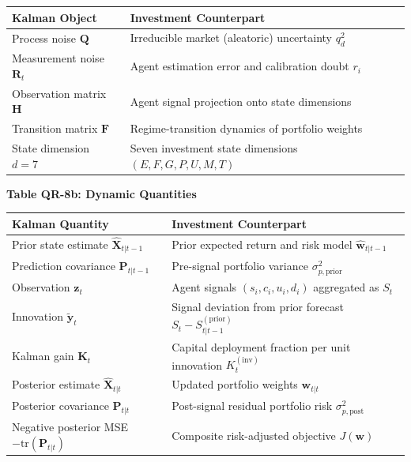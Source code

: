 \documentclass[12pt,openany]{book}
\newcommand{\calE}{\mathcal{E}}
\newcommand{\calF}{\mathcal{F}}
\newcommand{\calG}{\mathcal{G}}
\newcommand{\calP}{\mathcal{P}}
\newcommand{\calU}{\mathcal{U}}
\newcommand{\calM}{\mathcal{M}}
\newcommand{\calT}{\mathcal{T}}
\numberwithin{equation}{chapter}
\theoremstyle{plain}
\theoremstyle{definition}
\theoremstyle{remark}
\renewcommand{\arraystretch}{1.2}
\def\mathcal#1{#1}%
\begin{document}
\begin{center}
\small
\renewcommand{\arraystretch}{1.40}
\begin{tabularx}{\linewidth}{@{}
  >{\raggedright\arraybackslash}X
  >{\raggedright\arraybackslash}X
@{}}
\toprule
Kalman Object & Investment Counterpart \\
\midrule
Process noise $\mathbf{Q}$ & Irreducible market (aleatoric) uncertainty $q_d^2$ \\
Measurement noise $\mathbf{R}_t$ & Agent estimation error and calibration doubt $r_i$ \\
Observation matrix $\mathbf{H}$ & Agent signal projection onto state dimensions \\
Transition matrix $\mathbf{F}$ & Regime-transition dynamics of portfolio weights \\
State dimension $d=7$ & Seven investment state dimensions $(\calE,\calF,\calG,\calP,\calU,\calM,\calT)$ \\
\bottomrule
\end{tabularx}
\end{center}

\medskip
\noindent\textbf{Table QR-8b: Dynamic Quantities}

\begin{center}
\small
\renewcommand{\arraystretch}{1.40}
\begin{tabularx}{\linewidth}{@{}
  >{\raggedright\arraybackslash}X
  >{\raggedright\arraybackslash}X
@{}}
\toprule
Kalman Quantity & Investment Counterpart \\
\midrule
Prior state estimate $\hat{\mathbf{X}}_{t|t-1}$ & Prior expected return and risk model $\hat{\mathbf{w}}_{t|t-1}$ \\
Prediction covariance $\mathbf{P}_{t|t-1}$ & Pre-signal portfolio variance $\sigma_{p,\mathrm{prior}}^2$ \\
Observation $\mathbf{z}_t$ & Agent signals $(s_i,c_i,u_i,d_i)$ aggregated as $S_t$ \\
Innovation $\tilde{\mathbf{y}}_t$ & Signal deviation from prior forecast $S_t - S_{t|t-1}^{(\mathrm{prior})}$ \\
Kalman gain $\mathbf{K}_t$ & Capital deployment fraction per unit innovation $K_t^{(\mathrm{inv})}$ \\
Posterior estimate $\hat{\mathbf{X}}_{t|t}$ & Updated portfolio weights $\mathbf{w}_{t|t}$ \\
Posterior covariance $\mathbf{P}_{t|t}$ & Post-signal residual portfolio risk $\sigma_{p,\mathrm{post}}^2$ \\
Negative posterior MSE $-\mathrm{tr}(\mathbf{P}_{t|t})$ & Composite risk-adjusted objective $J(\mathbf{w})$ \\
\bottomrule
\end{tabularx}
\end{center}
\end{document}

